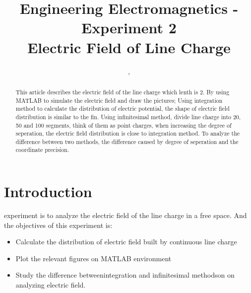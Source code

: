 \documentclass[10pt, journal, final]{IEEEtran}
\begin{document}
\title{Engineering Electromagnetics - Experiment 2\\ Electric Field of Line Charge}
\author{,
    \\
}

\maketitle

\begin{abstract}
    This article describes the electric field of the line charge which lenth is 2.
    By using MATLAB to simulate the electric field and draw the pictures;
    Using integration method to calculate the distribution of electric potential,
    the shape of electric field distribution is similar to the fin.
    Using infinitesimal method, divide line charge into 20, 50 and 100 segments,
    think of them as point charges, when increasing the degree of seperation, the
    electric field distribution is close to integration method.
    To analyze the difference between two methods, the difference caused by
    degree of seperation and the coordinate precision.
\end{abstract}

\section{
  Introduction
 }
\label{sec:Intro}

 experiment is to analyze the electric field of
the line charge in a free space. And the objectives of this experiment is:
\begin{itemize}
    \item Calculate the distribution of electric field
          built by continuous line charge
    \item Plot the relevant figures on MATLAB environment
    \item Study the difference betweenintegration and infinitesimal methodson
          on analyzing electric field.
\end{itemize}\par
\end{document}
